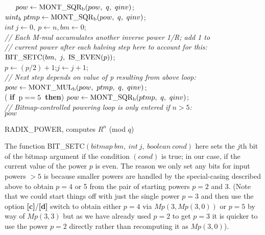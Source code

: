 \documentclass{article}
\begin{document}
\textheight=9.5in

\begin{algorithm}\SetAlgoLined
{}
{
	 {
		\qquad\ \ \ $pow \leftarrow {\rm MONT\_SQR_b}(pow,\ q,\ qinv)$;	\\
	}{
		$uint_b\ ptmp \leftarrow {\rm MONT\_SQR_b}(pow,\ q,\ qinv)$;	\\
		$int\ j \leftarrow 0,\ p \leftarrow n, bm \leftarrow 0$;	\\
		 {
			{\em// Each M-mul accumulates another inverse power 1/R; add 1 to}\\
			{\em// current power after each halving step here to account for this:}\\
			${\rm BIT\_SETC}(bm,\ j,\ {\rm IS\_EVEN}(p))$;\\
			$p \leftarrow (p/2) + 1$;\qquad $j \leftarrow j + 1$;\\
		}
		{\em// Next step depends on value of p resulting from above loop:}\\
		 {
			$pow \leftarrow {\rm MONT\_MUL_b}(pow,\ ptmp,\ q,\ qinv)$;\\
		} ( {\bf if}\ ${\rm p} == 5$\ {\bf then}) {
			$pow \leftarrow {\rm MONT\_SQR_b}(ptmp,\ q,\ qinv)$;\\
		}
		{\em// Bitmap-controlled powering loop is only entered if $n > 5$:}\\
	}
	\Return $pow$\;
}
\caption{RADIX\_POWER, computes $R^n$ (mod $q$)}
\label{POW}
\end{algorithm}
The function BIT\_SETC$(bitmap\ bm,\ int\ j,\ boolean\ cond)$ here sets the $j$th bit of the bitmap argument if the condition $(cond)$ is true; in our case, if the current value of the power $p$ is even. The reason we only set any bits for input powers $> 5$ is because smaller powers are handled by the special-casing described above to obtain $p = 4$ or 5 from the pair of starting powers $p = 2$ and 3. (Note that we could start things off with just the single power $p = 3$ and then use the option {\bf [c]}/{\bf [d]} switch to obtain either $p = 4$ via $Mp(3,Mp(3,0))$ or $p = 5$ by way of $Mp(3,3)$ but as we have already used $p = 2$ to get $p = 3$ it is quicker to use the power $p = 2$ directly rather than recomputing it as $Mp(3,0)$).
\end{document}
